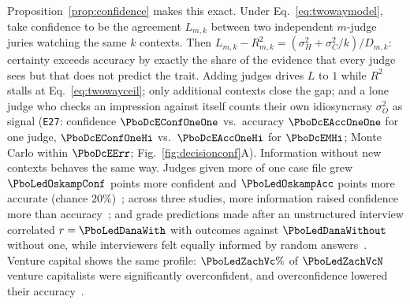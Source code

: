 Proposition~\ref{prop:confidence} makes this exact. Under Eq.~\eqref{eq:twowaymodel}, take confidence to be the agreement $L_{m,k}$ between two independent $m$-judge juries watching the same $k$ contexts. Then $L_{m,k}-R^2_{m,k}=(\sigma_H^2+\sigma_C^2/k)/D_{m,k}$: certainty exceeds accuracy by exactly the share of the evidence that every judge sees but that does not predict the trait. Adding judges drives $L$ to $1$ while $R^2$ stalls at Eq.~\eqref{eq:twowayceil}; only additional contexts close the gap; and a lone judge who checks an impression against itself counts their own idiosyncrasy $\sigma_O^2$ as signal (\texttt{E27}: confidence $\PboDcEConfOneOne$ vs.\ accuracy $\PboDcEAccOneOne$ for one judge, $\PboDcEConfOneHi$ vs.\ $\PboDcEAccOneHi$ for $\PboDcEMHi$; Monte Carlo within $\PboDcEErr$; Fig.~\ref{fig:decisionconf}A). Information without new contexts behaves the same way. Judges given more of one case file grew $\PboLedOskampConf$ points more confident and $\PboLedOskampAcc$ points more accurate (chance $20\%$)~\cite{oskamp1965}; across three studies, more information raised confidence more than accuracy~\cite{tsai2008}; and grade predictions made after an unstructured interview correlated $r=\PboLedDanaWith$ with outcomes against $\PboLedDanaWithout$ without one, while interviewers felt equally informed by random answers~\cite{dana2013}. Venture capital shows the same profile: $\PboLedZachVc\%$ of $\PboLedZachVcN$ venture capitalists were significantly overconfident, and overconfidence lowered their accuracy~\cite{zacharakis2001}.

